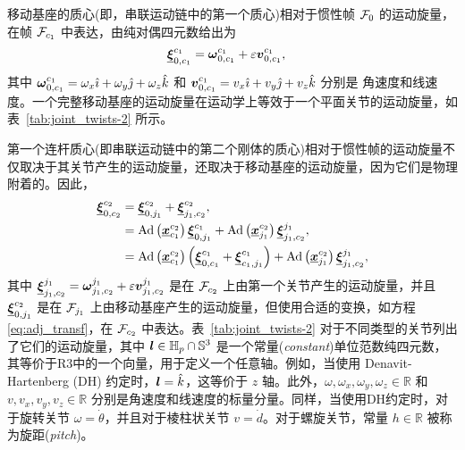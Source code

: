 移动基座的质心(即，串联运动链中的第一个质心)相对于惯性帧 $\mathcal{F}_{0}$ 的运动旋量，在帧 $\mathcal{F}_{c_{1}}$ 中表达，由纯对偶四元数给出为
\begin{align}
\underline{\boldsymbol{\xi}}_{0,c_{1}}^{c_{1}} & =\boldsymbol{\omega}_{0,c_{1}}^{c_{1}}+\varepsilon\boldsymbol{v}_{0,c_{1}}^{c_{1}},\label{eq:twist_c1_0}
\end{align}
其中 $\boldsymbol{\omega}_{0,c_{1}}^{c_{1}}=\omega_{x}\hat{\imath}+\omega_{y}\hat{\jmath}+\omega_{z}\hat{k}$
和 $\boldsymbol{v}_{0,c_{1}}^{c_{1}}=v_{x}\hat{\imath}+v_{y}\hat{\jmath}+v_{z}\hat{k}$ 分别是
角速度和线速度。一个完整移动基座的运动旋量在运动学上等效于一个平面关节的运动旋量，如表~\ref{tab:joint_twists-2} 所示。

第一个连杆质心(即串联运动链中的第二个刚体的质心)相对于惯性帧的运动旋量不仅取决于其关节产生的运动旋量，还取决于移动基座的运动旋量，因为它们是物理附着的。因此，
\begin{align}
\underline{\boldsymbol{\xi}}_{0,c_{2}}^{c_{2}} & =\underline{\boldsymbol{\xi}}_{0,j_{1}}^{c_{2}}+\underline{\boldsymbol{\xi}}_{j_{1},c_{2}}^{c_{2}},\nonumber \\
 & =\mathrm{Ad}\left(\underline{\boldsymbol{x}}_{c_{1}}^{c_{2}}\right)\underline{\boldsymbol{\xi}}_{0,j_{1}}^{c_{1}}+\mathrm{Ad}\left(\underline{\boldsymbol{x}}_{j_{1}}^{c_{2}}\right)\underline{\boldsymbol{\xi}}_{j_{1},c_{2}}^{j_{1}},\nonumber \\
 & =\mathrm{Ad}\left(\underline{\boldsymbol{x}}_{c_{1}}^{c_{2}}\right)\left(\underline{\boldsymbol{\xi}}_{0,c_{1}}^{c_{1}}+\underline{\boldsymbol{\xi}}_{c_{1},j_{1}}^{c_{1}}\right)+\mathrm{Ad}\left(\underline{\boldsymbol{x}}_{j_{1}}^{c_{2}}\right)\underline{\boldsymbol{\xi}}_{j_{1},c_{2}}^{j_{1}},\label{eq:twist_c2_0}
\end{align}
其中 $\underline{\boldsymbol{\xi}}_{j_{1},c_{2}}^{j_{1}}=\boldsymbol{\omega}_{j_{1},c_{2}}^{j_{1}}+\varepsilon\boldsymbol{v}_{j_{1},c_{2}}^{j_{1}}$
是在 $\mathcal{F}_{c_{2}}$ 上由第一个关节产生的运动旋量，并且 $\underline{\boldsymbol{\xi}}_{0,j_{1}}^{c_{2}}$ 是在 $\mathcal{F}_{j_{1}}$ 上由移动基座产生的运动旋量，但使用合适的变换，如方程 \eqref{eq:adj_transf}，在 $\mathcal{F}_{c_{2}}$ 中表达。表~\ref{tab:joint_twists-2} 对于不同类型的关节列出了它们的运动旋量，其中 $\boldsymbol{l}\in\mathbb{H}_{p}\cap\mathbb{S}^{3}$ 是一个常量(\emph{constant})单位范数纯四元数，其等价于R3中的一个向量，用于定义一个任意轴。例如，当使用 Denavit-Hartenberg (DH) 约定时，$\boldsymbol{l}=\hat{k}$，这等价于 $z$ 轴。此外，$\omega,\omega_{x},\omega_{y},\omega_{z}\in\mathbb{R}$ 和 $v,v_{x},v_{y},v_{z}\in\mathbb{R}$ 分别是角速度和线速度的标量分量。同样，当使用DH约定时，对于旋转关节 $\omega=\dot{\theta}$，并且对于棱柱状关节 $v=\dot{d}$。对于螺旋关节，常量 $h\in\mathbb{R}$ 被称为旋距(\emph{pitch})。

